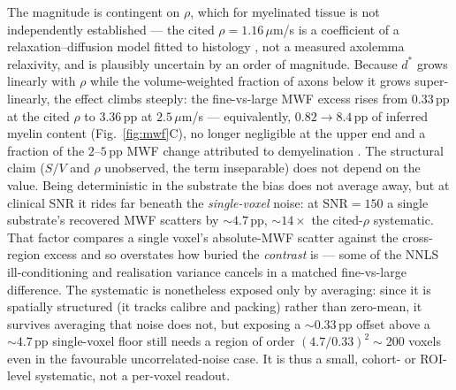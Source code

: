 The magnitude is contingent on $\rho$, which for myelinated tissue is not independently
established --- the cited $\rho=1.16\,\mu$m/s is a coefficient of a relaxation--diffusion
model fitted to histology \citep{Barakovic2023}, not a measured axolemma relaxivity, and
is plausibly uncertain by an order of magnitude. Because $d^{\ast}$ grows linearly with
$\rho$ while the volume-weighted fraction of axons below it grows super-linearly, the
effect climbs steeply: the fine-vs-large MWF excess rises from $0.33$\,pp at the cited
$\rho$ to $3.36$\,pp at $2.5\,\mu$m/s --- equivalently, $0.82\!\to\!8.4$\,pp of inferred
myelin content (Fig.~\ref{fig:mwf}C), no longer negligible at the upper end and a fraction
of the $2$--$5$\,pp MWF change attributed to demyelination
\citep{Laule2004, Laule2006, Kitzler2012}. The structural claim ($S/V$ and $\rho$
unobserved, the term inseparable) does not depend on the value. Being deterministic in the
substrate the bias does not average away, but at clinical SNR it rides far beneath the
\emph{single-voxel} noise: at $\mathrm{SNR}=150$ a single substrate's recovered MWF scatters by
${\sim}4.7$\,pp, ${\sim}14\times$ the cited-$\rho$ systematic. That factor compares a single
voxel's absolute-MWF scatter against the cross-region excess and so overstates how buried the
\emph{contrast} is --- some of the NNLS ill-conditioning and realisation variance cancels in a
matched fine-vs-large difference. The systematic is nonetheless exposed only by averaging: since
it is spatially structured (it tracks calibre and packing) rather than zero-mean, it survives
averaging that noise does not, but exposing a ${\sim}0.33$\,pp offset above a ${\sim}4.7$\,pp
single-voxel floor still needs a region of order $(4.7/0.33)^2\!\sim\!200$ voxels even in the
favourable uncorrelated-noise case. It is thus a small, cohort- or ROI-level systematic, not a
per-voxel readout.

